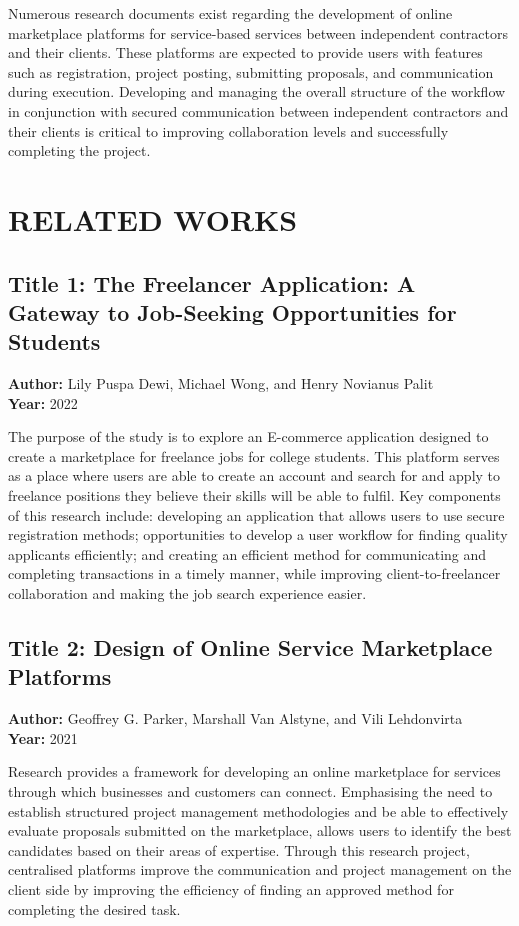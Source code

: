 \documentclass[12pt,a4paper,oneside]{report}
\numberwithin{figure}{chapter}
\numberwithin{table}{chapter}
\begin{document}
\indent Numerous research documents exist regarding the development of online marketplace
platforms for service-based services between independent contractors and their clients.
These platforms are expected to provide users with features such as registration, project
posting, submitting proposals, and communication during execution. Developing and managing
the overall structure of the workflow in conjunction with secured communication between
independent contractors and their clients is critical to improving collaboration levels
and successfully completing the project.

\section{RELATED WORKS}

\subsection{Title 1: The Freelancer Application: A Gateway to Job-Seeking Opportunities for Students}

\noindent\textbf{Author:} Lily Puspa Dewi, Michael Wong, and Henry Novianus Palit\\
\textbf{Year:} 2022

The purpose of the study is to explore an E-commerce application designed to create a
marketplace for freelance jobs for college students. This platform serves as a place where
users are able to create an account and search for and apply to freelance positions they
believe their skills will be able to fulfil. Key components of this research include:
developing an application that allows users to use secure registration methods;
opportunities to develop a user workflow for finding quality applicants efficiently; and
creating an efficient method for communicating and completing transactions in a timely
manner, while improving client-to-freelancer collaboration and making the job search
experience easier.

\subsection{Title 2: Design of Online Service Marketplace Platforms}

\noindent\textbf{Author:} Geoffrey G. Parker, Marshall Van Alstyne, and Vili Lehdonvirta\\
\textbf{Year:} 2021

Research provides a framework for developing an online marketplace for services through
which businesses and customers can connect. Emphasising the need to establish structured
project management methodologies and be able to effectively evaluate proposals submitted
on the marketplace, allows users to identify the best candidates based on their areas of
expertise. Through this research project, centralised platforms improve the communication
and project management on the client side by improving the efficiency of finding an
approved method for completing the desired task.
\end{document}
